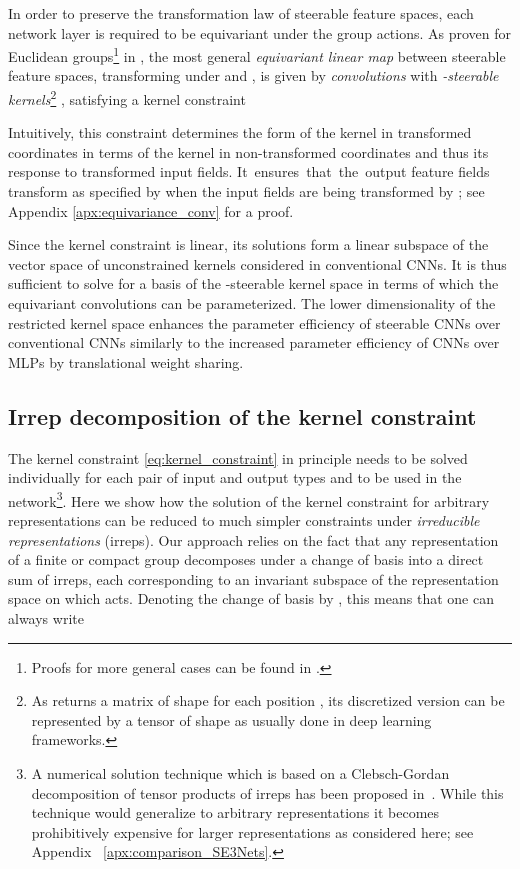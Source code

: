 \documentclass{article}
\newcommand{\apx}{Appendix\xspace
}
\newlength{\secBefore}
\newlength{\secAfter}
\newlength{\subsecBefore}
\newlength{\subsecAfter}
\begin{document}
In order to preserve the transformation law of steerable feature spaces, each network layer is required to be equivariant under the group actions.
As proven for Euclidean groups\footnote{
    Proofs for more general cases can be found in \cite{Cohen2018-IIR,generaltheory}.
}
in \cite{3d_steerableCNNs}, the most general \emph{equivariant linear map} between 
steerable feature spaces, transforming under  and ,
is given by \emph{convolutions} with \emph{-steerable kernels}\footnote{
    As  returns a matrix of shape  for each position , its discretized version can be represented by a tensor of shape  as usually done in deep learning frameworks.
}
, satisfying a kernel constraint

Intuitively, this constraint determines the form of the kernel in transformed coordinates  in terms of the kernel in non-transformed coordinates  and thus its response to transformed input fields.
It~ensures~that~the~output feature fields transform as specified by  when the input fields are being transformed by ; see \apx \ref{apx:equivariance_conv} for a proof.

Since the kernel constraint is linear, its solutions form a linear subspace of the vector space of unconstrained kernels considered in conventional CNNs.
It is thus sufficient to solve for a basis of the -steerable kernel space in terms of which the equivariant convolutions can be parameterized.
The lower dimensionality of the restricted kernel space enhances the parameter efficiency of steerable CNNs over conventional CNNs similarly to the increased parameter efficiency of CNNs over MLPs by translational weight sharing.

 	

\vspace*{\subsecBefore}
\subsection{Irrep decomposition of the kernel constraint}
\label{sec:irrep_decomposition}
\vspace*{\subsecAfter}

The kernel constraint \eqref{eq:kernel_constraint} in principle needs to be solved individually for each pair of input and output types  and  to be used in the network\footnote{
		A numerical solution technique which is based on a Clebsch-Gordan decomposition of tensor products of irreps has been proposed in~\cite{3d_steerableCNNs}.
		While this technique would generalize to arbitrary representations it becomes prohibitively expensive for larger representations as considered here; see \apx~\ref{apx:comparison_SE3Nets}.
}.
Here we show how the solution of the kernel constraint for arbitrary representations can be reduced to much simpler constraints under \emph{irreducible representations} (irreps).
Our approach relies on the fact that any representation of a finite or compact group decomposes under a change of basis into a direct sum of irreps, each corresponding to an invariant subspace of the representation space  on which  acts.
Denoting the change of basis by , this means that one can always write
\end{document}
